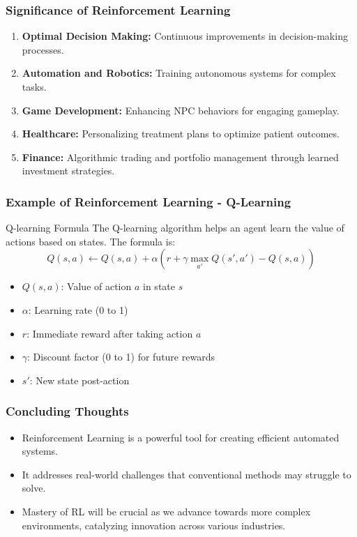 \documentclass[aspectratio=169]{beamer}
\begin{document}
\begin{frame}[fragile]
    \frametitle{Significance of Reinforcement Learning}
    \begin{enumerate}
        \item \textbf{Optimal Decision Making:} Continuous improvements in decision-making processes. 
        \item \textbf{Automation and Robotics:} Training autonomous systems for complex tasks.
        \item \textbf{Game Development:} Enhancing NPC behaviors for engaging gameplay.
        \item \textbf{Healthcare:} Personalizing treatment plans to optimize patient outcomes.
        \item \textbf{Finance:} Algorithmic trading and portfolio management through learned investment strategies.
    \end{enumerate}
\end{frame}

\begin{frame}[fragile]
    \frametitle{Example of Reinforcement Learning - Q-Learning}
    \begin{block}{Q-learning Formula}
        The Q-learning algorithm helps an agent learn the value of actions based on states. The formula is: 
        \[
        Q(s, a) \gets Q(s, a) + \alpha \left( r + \gamma \max_{a'} Q(s', a') - Q(s, a) \right)
        \]
    \end{block}
    \begin{itemize}
        \item \( Q(s, a) \): Value of action \( a \) in state \( s \)
        \item \( \alpha \): Learning rate (0 to 1)
        \item \( r \): Immediate reward after taking action \( a \)
        \item \( \gamma \): Discount factor (0 to 1) for future rewards
        \item \( s' \): New state post-action
    \end{itemize}
\end{frame}

\begin{frame}[fragile]
    \frametitle{Concluding Thoughts}
    \begin{itemize}
        \item Reinforcement Learning is a powerful tool for creating efficient automated systems.
        \item It addresses real-world challenges that conventional methods may struggle to solve.
        \item Mastery of RL will be crucial as we advance towards more complex environments, catalyzing innovation across various industries.
    \end{itemize}
\end{frame}
\end{document}
